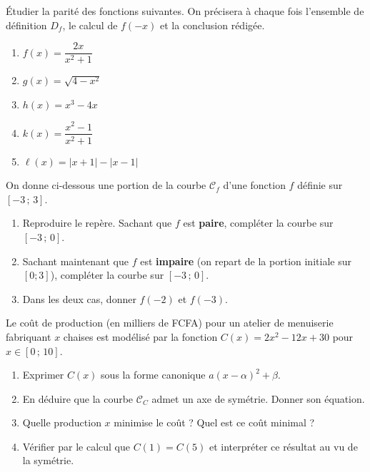 \documentclass[11pt]{article}
\newcounter{popsec}
\newcounter{popsub}
\newcommand{\courssub}[1]{%
  \stepcounter{popsub}%
  \par\vspace{9pt}\noindent{\popxbold\fontsize{11.5}{13}\selectfont\color{popink}{\color{poporange}\thepopsec.\thepopsub}\hspace{6pt}#1}\par\nopagebreak\vspace{4pt}
}
\begin{document}
\courssub{Je m'entraîne}

\begin{exercice}
Étudier la parité des fonctions suivantes. On précisera à chaque fois l'ensemble de définition $D_f$, le calcul de $f(-x)$ et la conclusion rédigée.
\begin{enumerate}
    \item $f(x) = \dfrac{2x}{x^2+1}$
    \item $g(x) = \sqrt{4-x^2}$
    \item $h(x) = x^3 - 4x$
    \item $k(x) = \dfrac{x^2-1}{x^2+1}$
    \item $\ell(x) = |x+1| - |x-1|$
\end{enumerate}
\end{exercice}

\begin{exercice}
On donne ci-dessous une portion de la courbe $\mathcal{C}_f$ d'une fonction $f$ définie sur $[-3\,;\,3]$.
\begin{center}
\end{center}
\begin{enumerate}
    \item Reproduire le repère. Sachant que $f$ est \textbf{paire}, compléter la courbe sur $[-3\,;\,0]$.
    \item Sachant maintenant que $f$ est \textbf{impaire} (on repart de la portion initiale sur $[0;3]$), compléter la courbe sur $[-3\,;\,0]$.
    \item Dans les deux cas, donner $f(-2)$ et $f(-3)$.
\end{enumerate}
\end{exercice}

\begin{exercice}
Le coût de production (en milliers de FCFA) pour un atelier de menuiserie fabriquant $x$ chaises est modélisé par la fonction $C(x)=2x^2-12x+30$ pour $x \in [0\,;\,10]$.
\begin{enumerate}
    \item Exprimer $C(x)$ sous la forme canonique $a(x-\alpha)^2+\beta$.
    \item En déduire que la courbe $\mathcal{C}_C$ admet un axe de symétrie. Donner son équation.
    \item Quelle production $x$ minimise le coût ? Quel est ce coût minimal ?
    \item Vérifier par le calcul que $C(1)=C(5)$ et interpréter ce résultat au vu de la symétrie.
\end{enumerate}
\end{exercice}
\end{document}
